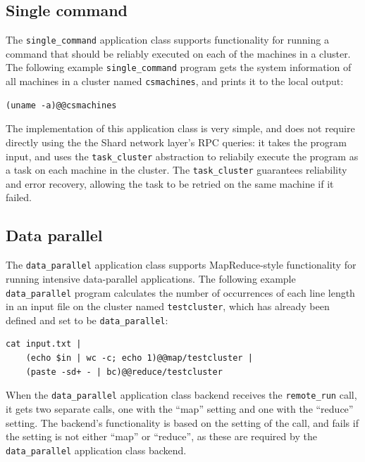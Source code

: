 \documentclass[twoside]{report}
\begin{document}
\subsection{Single command}

\begin{sloppypar}
  The \texttt{single\_command} application class supports functionality for running a command that should be reliably executed on each of the machines in a cluster. The following example \texttt{single\_command} program gets the system information of all machines in a cluster named \texttt{csmachines}, and prints it to the local output:
\end{sloppypar}

\begin{lstlisting}
(uname -a)@@csmachines 
\end{lstlisting}

\begin{sloppypar}
  The implementation of this application class is very simple, and does not require directly using the the Shard network layer's RPC queries: it takes the program input, and uses the \texttt{task\_cluster} abstraction to reliabily execute the program as a task on each machine in the cluster.
  The \texttt{task\_cluster} guarantees reliability and error recovery, allowing the task to be retried on the same machine if it failed.
\end{sloppypar}

\subsection{Data parallel}

The \texttt{data\_parallel} application class supports MapReduce-style functionality for running intensive data-parallel applications.
The following example \texttt{data\_parallel} program calculates the number of occurrences of each line length in an input file on the cluster named \texttt{testcluster}, which has already been defined and set to be \texttt{data\_parallel}:

\begin{lstlisting}[language=shard]
cat input.txt |
    (echo $in | wc -c; echo 1)@@map/testcluster |
    (paste -sd+ - | bc)@@reduce/testcluster
\end{lstlisting}

When the \texttt{data\_parallel} application class backend receives the \texttt{remote\_run} call, it gets two separate calls, one with the ``map'' setting and one with the ``reduce'' setting.
The backend's functionality is based on the setting of the call, and fails if the setting is not either ``map'' or ``reduce'', as these are required by the \texttt{data\_parallel} application class backend.
\end{document}
